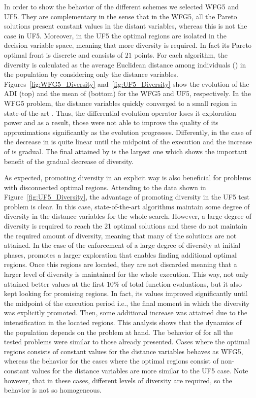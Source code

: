 In order to show the behavior of the different schemes we selected WFG5 and UF5.
%
They are complementary in the sense that in the WFG5, all the Pareto solutions present constant 
values in the distant variables, whereas this is not the case in UF5.
%
Moreover, in the UF5 the optimal regions are isolated in the decision variable 
space, meaning that more diversity is required.
%
In fact its Pareto optimal front is discrete and consists of $21$ points.
%
For each algorithm, the diversity is calculated as the average Euclidean distance among individuals (\ADI{}) in the population 
by considering only the distance variables.
%
Figures~\ref{fig:WFG5_Diversity} and~\ref{fig:UF5_Diversity} show the evolution of the ADI (top) and the mean of \HV{} (bottom) 
for the WFG5 and UF5, respectively.
%
In the WFG5 problem, the distance variables quickly converged to a small region 
in state-of-the-art \MOEAS{}.
%
Thus, the differential evolution operator loses it exploration power and as a result,
those \MOEAS{} were not able to improve the quality of its approximations significantly as the
evolution progresses.
%
Differently, in the case of \AVSDMOEAD{} the decrease in \ADI{} is quite linear until the midpoint of the execution and
the increase of \HV{} is gradual.
%
The final \HV{} attained by \AVSDMOEAD{} is the largest one which shows the important benefit
of the gradual decrease of diversity.

As expected, promoting diversity in an explicit way is also beneficial for problems with disconnected optimal regions.
%
Attending to the data shown in Figure~\ref{fig:UF5_Diversity}, the advantage of promoting diversity in the UF5 test 
problem is clear.
%
In this case, state-of-the-art algorithms maintain some degree of diversity in the distance variables for
the whole search.
%
However, a large degree of diversity is required to reach the 21 optimal solutions and these \MOEAS{} do not maintain
the required amount of diversity, meaning that many of the solutions are not attained.
%
In the case of \AVSDMOEAD{} the enforcement of a large degree of diversity at initial phases, promotes a larger exploration 
that enables finding additional optimal regions.
%
Once this regions are located, they are not discarded meaning that a larger level of diversity is maintained for the whole
execution.
%
This way, \AVSDMOEAD{} not only attained better \HV{} values at the first $10\%$ of total function evaluations, but 
it also kept looking for promising regions.
%
In fact, its \HV{} values improved significantly until the midpoint of the execution period i.e., the final moment
in which the diversity was explicitly promoted.
%
Then, some additional increase was attained due to the intensification in the located regions.
%
This analysis shows that the dynamics of the population depends on the problem at hand.
%
The behavior of \AVSDMOEAD{} for all the tested problems 
were similar to those already presented.
%
Cases where the optimal regions consists of constant values for the distance variables behaves as WFG5, whereas
the behavior for the cases where the optimal regions consist of non-constant values for the distance variables are
more similar to the UF5 case.
%
Note however, that in these cases, different levels of diversity are required, so the behavior is not so homogeneous.

